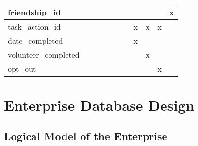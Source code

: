 \documentclass[11pt, a4paper]{report}
\begin{document}
\begin{longtable}{|l|l|l|l|l|l|l|l|l|l|l|}
friendship\_id     &   &   &   &   &   &   &   &   &   & x   \\ \hline

task\_action\_id &   &   &   &   &   &   & x  & x & x & \\ \hline
date\_completed &   &   &   &   &  &   &  x  &   &   & \\ \hline
volunteer\_completed &   &   &   &   &  &   &   & x  &   & \\ \hline
opt\_out &   &   &   &   &  &   &   &   & x  & \\ \hline



\end{longtable}



\chapter{Enterprise Database Design}
\section{Logical Model of the Enterprise}
\end{document}
